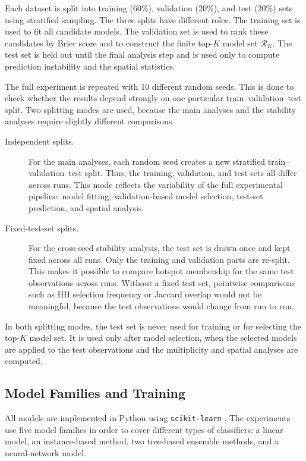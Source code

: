 Each dataset is split into training (60\%), validation (20\%), and test (20\%) sets using
stratified sampling. The three splits have different roles. The training set is used to fit
all candidate models. The validation set is used to rank these candidates by Brier score
and to construct the finite top-$K$ model set $\mathcal{R}_K$. The test set is held out
until the final analysis step and is used only to compute prediction instability and the
spatial statistics.

The full experiment is repeated with 10 different random seeds. This is done to check
whether the results depend strongly on one particular train--validation--test split. Two
splitting modes are used, because the main analyses and the stability analyses require
slightly different comparisons.

\begin{description}
  \item[Independent splits.] For the main analyses, each random seed creates a new
  stratified train--validation--test split. Thus, the training, validation, and test sets all
  differ across runs. This mode reflects the variability of the full experimental pipeline:
  model fitting, validation-based model selection, test-set prediction, and spatial
  analysis.

  \item[Fixed-test-set splits.] For the cross-seed stability analysis, the test set is drawn
  once and kept fixed across all runs. Only the training and validation parts are re-split.
  This makes it possible to compare hotspot membership for the same test observations
  across runs. Without a fixed test set, pointwise comparisons such as HH selection
  frequency or Jaccard overlap would not be meaningful, because the test observations
  would change from run to run.
\end{description}

In both splitting modes, the test set is never used for training or for selecting the
top-$K$ model set. It is used only after model selection, when the selected models are
applied to the test observations and the multiplicity and spatial analyses are computed.

\subsection{Model Families and Training}

All models are implemented in Python using \texttt{scikit-learn}
\citep{pedregosa2011scikit}. The experiments use five model families in order to
cover different types of classifiers: a linear model, an instance-based method, two
tree-based ensemble methods, and a neural-network model.

